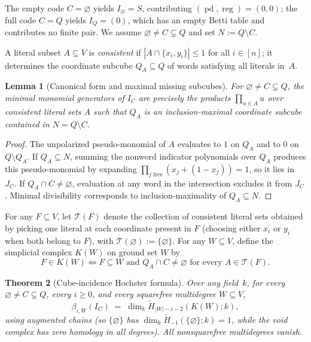 \documentclass[11pt]{article}
\theoremstyle{plain}
\newtheorem{theorem}{Theorem}
\newtheorem{lemma}[theorem]{Lemma}
\theoremstyle{definition}
\theoremstyle{remark}
\DeclareMathOperator{\pd}{pd}
\DeclareMathOperator{\reg}{reg}
\begin{document}
The empty code $C = \varnothing$ yields $I_\varnothing = S$, contributing $(\pd,\reg) = (0,0)$; the full code $C = Q$ yields $I_Q = (0)$, which has an empty Betti table and contributes no finite pair. We assume $\varnothing \neq C \subsetneq Q$ and set $N := Q \setminus C$.

A literal subset $A \subseteq V$ is \emph{consistent} if $|A \cap \{x_i,y_i\}| \le 1$ for all $i \in [n]$; it determines the coordinate subcube $Q_A \subseteq Q$ of words satisfying all literals in~$A$.

\begin{lemma}[Canonical form and maximal missing subcubes]\label{lem:canon}
For $\varnothing \neq C \subsetneq Q$, the minimal monomial generators of $I_C$ are precisely the products $\prod_{u\in A} u$ over consistent literal sets $A$ such that $Q_A$ is an inclusion-maximal coordinate subcube contained in $N = Q \setminus C$.
\end{lemma}

\begin{proof}
The unpolarized pseudo-monomial of $A$ evaluates to $1$ on $Q_A$ and to $0$ on $Q \setminus Q_A$. If $Q_A \subseteq N$, summing the nonword indicator polynomials over $Q_A$ produces this pseudo-monomial by expanding $\prod_{j \text{ free}} (x_j + (1-x_j)) = 1$, so it lies in $J_C$. If $Q_A \cap C \neq \varnothing$, evaluation at any word in the intersection excludes it from $J_C$. Minimal divisibility corresponds to inclusion-maximality of $Q_A \subseteq N$.
\end{proof}

For any $F \subseteq V$, let $\mathcal{T}(F)$ denote the collection of consistent literal sets obtained by picking one literal at each coordinate present in $F$ (choosing either $x_i$ or $y_i$ when both belong to $F$), with $\mathcal{T}(\varnothing) := \{\varnothing\}$. For any $W \subseteq V$, define the simplicial complex $K(W)$ on ground set $W$ by
\[
F \in K(W) \iff F \subseteq W \text{ and } Q_A \cap C \neq \varnothing \text{ for every } A \in \mathcal{T}(F).
\]

\begin{theorem}[Cube-incidence Hochster formula]\label{thm:hochster}
Over any field~$k$, for every $\varnothing \neq C \subsetneq Q$, every $i \ge 0$, and every squarefree multidegree $W \subseteq V$,
\begin{equation}\label{eq:hochster}
\beta_{i,W}(I_C) \;=\; \dim_k \widetilde{H}_{|W|-i-2}(K(W); k),
\end{equation}
using augmented chains (so $\{\varnothing\}$ has $\dim_k \widetilde{H}_{-1}(\{\varnothing\};k) = 1$, while the void complex has zero homology in all degrees). All nonsquarefree multidegrees vanish.
\end{theorem}
\end{document}
